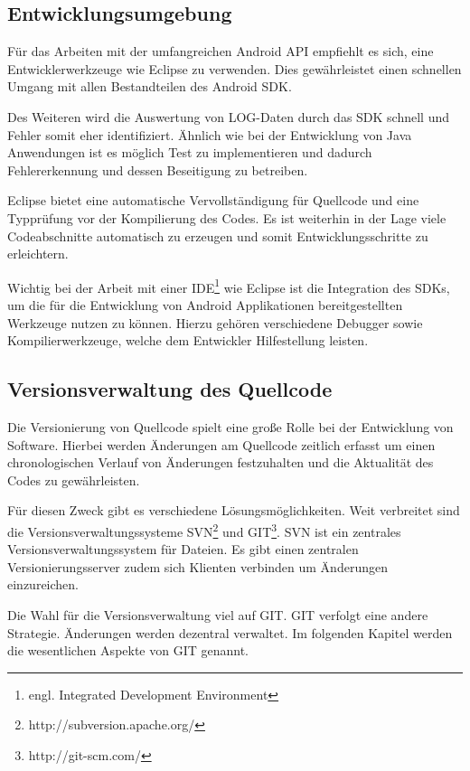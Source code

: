 \subsection{Entwicklungsumgebung}

Für das Arbeiten mit der umfangreichen Android API empfiehlt es sich, eine Entwicklerwerkzeuge wie Eclipse zu verwenden. Dies gewährleistet einen schnellen Umgang mit allen Bestandteilen des Android SDK.

Des Weiteren wird die Auswertung von LOG-Daten durch das SDK schnell und Fehler somit eher identifiziert. Ähnlich wie bei der Entwicklung von Java Anwendungen ist es möglich Test zu implementieren und dadurch Fehlererkennung und dessen Beseitigung zu betreiben.

Eclipse bietet eine automatische Vervollständigung für Quellcode und eine Typprüfung vor der Kompilierung des Codes. Es ist weiterhin in der Lage viele Codeabschnitte automatisch zu erzeugen und somit Entwicklungsschritte zu erleichtern.

Wichtig bei der Arbeit mit einer IDE\footnote{engl. Integrated Development Environment} wie Eclipse ist die Integration des SDKs, um die für die Entwicklung von Android Applikationen bereitgestellten Werkzeuge nutzen zu können. Hierzu gehören verschiedene Debugger sowie Kompilierwerkzeuge, welche dem Entwickler Hilfestellung leisten.

\subsection{Versionsverwaltung des Quellcode}

Die Versionierung von Quellcode spielt eine große Rolle bei der Entwicklung von Software. Hierbei werden Änderungen am Quellcode zeitlich erfasst um einen chronologischen Verlauf von Änderungen festzuhalten und die Aktualität des Codes zu gewährleisten.

Für diesen Zweck gibt es verschiedene Lösungsmöglichkeiten. Weit verbreitet sind die Versionsverwaltungssysteme SVN\footnote{http://subversion.apache.org/} und GIT\footnote{http://git-scm.com/}.
SVN ist ein zentrales Versionsverwaltungssystem für Dateien. Es gibt einen zentralen Versionierungsserver zudem sich Klienten verbinden um Änderungen einzureichen.

Die Wahl für die Versionsverwaltung viel auf GIT. GIT verfolgt eine andere Strategie. Änderungen werden dezentral verwaltet. Im folgenden Kapitel werden die wesentlichen Aspekte von GIT genannt.

